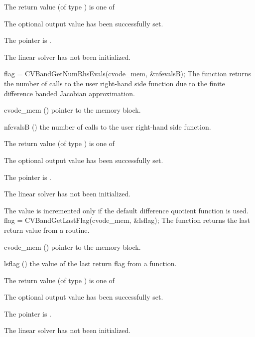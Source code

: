 {
  The return value  (of type ) is one of
  \begin{args}
  \item[\Id{CVBAND\_SUCCESS}] 
    The optional output value has been successfully set.
  \item[\Id{CVBAND\_MEM\_NULL}]
    The  pointer is .
  \item[\Id{CVBAND\_LMEM\_NULL}]
    The {\cvband} linear solver has not been initialized.
  \end{args}
}
{}
{
  flag = CVBandGetNumRhsEvals(cvode\_mem, \&nfevalsB);
}
{
  The function  returns the
  number of calls to the user right-hand side function due to the 
  finite difference banded Jacobian approximation.
}
{
  \begin{args}
  \item[cvode\_mem] ()
    pointer to the {\cvode} memory block.
  \item[nfevalsB] ()
    the number of calls to the user right-hand side function.
  \end{args}
}
{
  The return value  (of type ) is one of
  \begin{args}
  \item[\Id{CVBAND\_SUCCESS}] 
    The optional output value has been successfully set.
  \item[\Id{CVBAND\_MEM\_NULL}]
    The  pointer is .
  \item[\Id{CVBAND\_LMEM\_NULL}]
    The {\cvband} linear solver has not been initialized.
  \end{args}
}
{
  The value  is incremented only if the default 
   difference quotient function is used.
}
{
  flag = CVBandGetLastFlag(cvode\_mem, \&lsflag);
}
{
  The function  returns the
  last return value from a {\cvband} routine. 
}
{
  \begin{args}
  \item[cvode\_mem] ()
    pointer to the {\cvode} memory block.
  \item[lsflag] ()
    the value of the last return flag from a {\cvband} function.
  \end{args}
}
{
  The return value  (of type ) is one of
  \begin{args}
  \item[\Id{CVBAND\_SUCCESS}] 
    The optional output value has been successfully set.
  \item[\Id{CVBAND\_MEM\_NULL}]
    The  pointer is .
  \item[\Id{CVBAND\_LMEM\_NULL}]
    The {\cvband} linear solver has not been initialized.
  \end{args}
}
